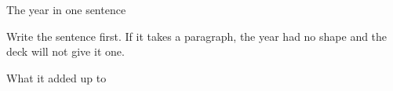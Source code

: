 \begin{frame}{The year in one sentence}
  \begin{pullquote}
  Write the sentence first. If it takes a paragraph, the year had no shape and the deck will
  not give it one.
  \end{pullquote}
\end{frame}

\begin{frame}{What it added up to}
\end{frame}
